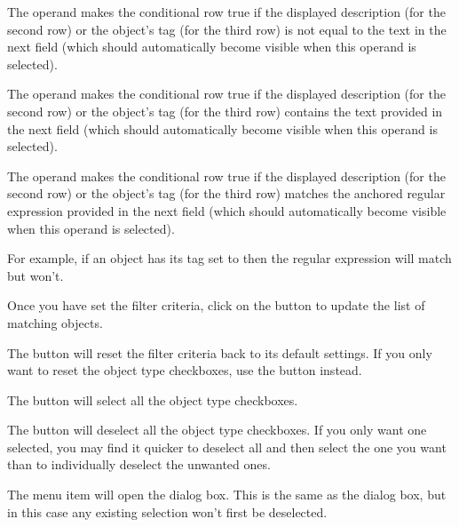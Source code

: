 The  operand makes the
conditional row
true if the displayed description (for the second row) or the
object's tag (for the third row) is not equal to the text in the
next field (which should automatically become visible when
this operand is selected).

The  operand makes the
conditional row
true if the displayed description (for the second row) or the
object's tag (for the third row) contains the text provided
in the next field (which should automatically become visible when
this operand is selected).

The  operand makes the
conditional row
true if the displayed description (for the second row) or the
object's tag (for the third row) matches the anchored regular
expression provided in the next field (which should automatically
become visible when this operand is selected).

For example, if an object has its tag set to  then
the regular expression  will match but  won't.


Once you have set the filter criteria, click on the
 button to update the
list of matching objects.

The  button will reset the filter
criteria back to its default settings. If you only want to reset the
\gls{object} type checkboxes, use the 
button instead.

The  button will 
select all the \gls{object} type checkboxes.

The  button will 
deselect all the \gls{object} type checkboxes.
If you only want one selected, you may find it quicker to deselect
all and then select the one you want than to individually deselect the
unwanted ones.


The  menu item will open the
 dialog box. This is the same
as the  dialog box, but in this case any
existing selection won't first be deselected.

